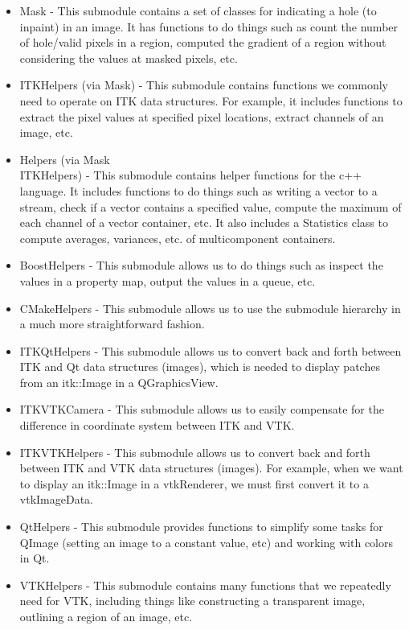 \documentclass{InsightArticle}
\begin{document}
\begin{itemize}
 \item Mask - This submodule contains a set of classes for indicating a hole (to inpaint) in an image. It has functions to do things such as count the number of hole/valid pixels in a region, computed the gradient of a region without considering the values at masked pixels, etc.
 \item ITKHelpers (via Mask) - This submodule contains functions we commonly need to operate on ITK data structures. For example, it includes functions to extract the pixel values at specified pixel locations, extract channels of an image, etc.
 \item Helpers (via Mask\\ITKHelpers) - This submodule contains helper functions for the c++ language. It includes functions to do things such as writing a vector to a stream, check if a vector contains a specified value, compute the maximum of each channel of a vector container, etc. It also includes a Statistics class to compute averages, variances, etc. of multicomponent containers.
 \item BoostHelpers - This submodule allows us to do things such as inspect the values in a property map, output the values in a queue, etc.
 \item CMakeHelpers - This submodule allows us to use the submodule hierarchy in a much more straightforward fashion.
 \item ITKQtHelpers - This submodule allows us to convert back and forth between ITK and Qt data structures (images), which is needed to display patches from an itk::Image in a QGraphicsView.
 \item ITKVTKCamera - This submodule allows us to easily compensate for the difference in coordinate system between ITK and VTK.
 \item ITKVTKHelpers - This submodule allows us to convert back and forth between ITK and VTK data structures (images). For example, when we want to display an itk::Image in a vtkRenderer, we must first convert it to a vtkImageData.
 \item QtHelpers - This submodule provides functions to simplify some tasks for QImage (setting an image to a constant value, etc) and working with colors in Qt.
 \item VTKHelpers - This submodule contains many functions that we repeatedly need for VTK, including things like constructing a transparent image, outlining a region of an image, etc.
\end{itemize}
\end{document}
